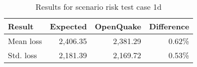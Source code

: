 \begin{table}[htbp]

\centering
\begin{tabular}{ l r r r }

\hline
\rowcolor{anti-flashwhite}
\bf{Result} & \bf{Expected} & \bf{OpenQuake} & \bf{Difference}\\
\hline
Mean loss & 2,406.35 & 2,381.29 & 0.62\% \\
Std. loss & 2,181.39 & 2,169.72 & 0.53\% \\
\hline
\end{tabular}

\caption{Results for scenario risk test case 1d}
\label{tab:result-scenario-risk-1d}
\end{table}